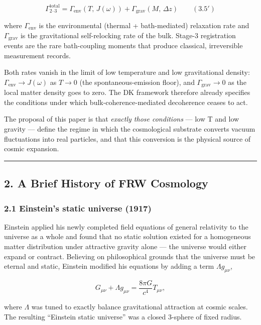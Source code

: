 \documentclass[
]{article}
\begin{document}
\[\Gamma_{\text{2–3}}^{\text{total}} = \Gamma_{\text{env}}(T,\, J(\omega)) + \Gamma_{\text{grav}}(M,\, \Delta z) \qquad (3.5')\]

where \(\Gamma_{\text{env}}\) is the environmental (thermal +
bath-mediated) relaxation rate and \(\Gamma_{\text{grav}}\) is the
gravitational self-relocking rate of the bulk. Stage-3 registration
events are the rare bath-coupling moments that produce classical,
irreversible measurement records.

Both rates vanish in the limit of low temperature and low gravitational
density: \(\Gamma_{\text{env}} \to J(\omega)\) as \(T \to 0\) (the
spontaneous-emission floor), and \(\Gamma_{\text{grav}} \to 0\) as the
local matter density goes to zero. The DK framework therefore already
specifies the conditions under which bulk-coherence-mediated decoherence
ceases to act.

The proposal of this paper is that \emph{exactly those conditions} ---
low T and low gravity --- define the regime in which the cosmological
substrate converts vacuum fluctuations into real particles, and that
this conversion is the physical source of cosmic expansion.

\begin{center}\rule{0.5\linewidth}{0.5pt}\end{center}

\subsection{2. A Brief History of FRW
Cosmology}\label{a-brief-history-of-frw-cosmology}

\subsubsection{2.1 Einstein's static universe
(1917)}\label{einsteins-static-universe-1917}

Einstein applied his newly completed field equations of general
relativity to the universe as a whole and found that no static solution
existed for a homogeneous matter distribution under attractive gravity
alone --- the universe would either expand or contract. Believing on
philosophical grounds that the universe must be eternal and static,
Einstein modified his equations by adding a term \(\Lambda g_{\mu\nu}\),

\[G_{\mu\nu} + \Lambda g_{\mu\nu} = \frac{8 \pi G}{c^4} T_{\mu\nu},\]

where \(\Lambda\) was tuned to exactly balance gravitational attraction
at cosmic scales. The resulting ``Einstein static universe'' was a
closed 3-sphere of fixed radius.
\end{document}
